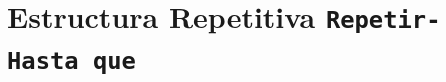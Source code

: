 \section{Estructura Repetitiva \texttt{Repetir-Hasta que}}
\label{sec:grupo3}
 

\newpage
 

\newpage
 

\newpage
 

\newpage
 

\newpage
 

\newpage
 

\newpage